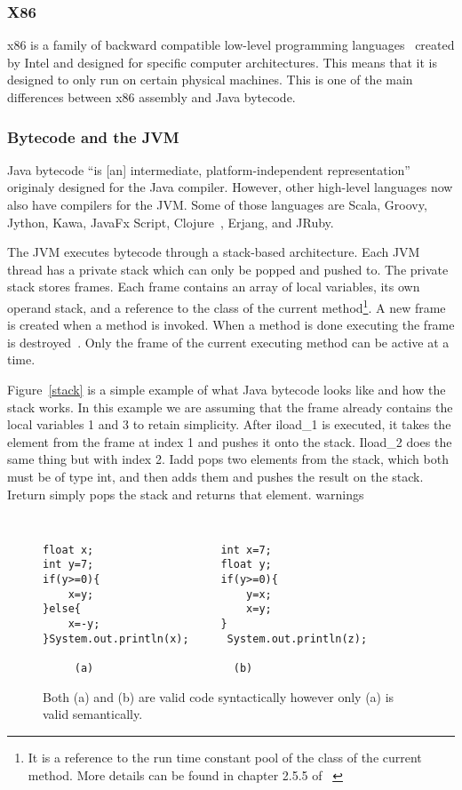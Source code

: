 \documentclass{sig-alternate}
\begin{document}
\subsubsection{X86}
x86 is a family of backward compatible low-level programming languages~\cite{x86assembly:2014} created by Intel and designed for specific computer architectures. This means that it is designed to only run on certain physical machines. This is one of the main differences between x86 assembly and Java bytecode. 

\subsubsection{ Bytecode and the JVM}
Java bytecode ``is [an] intermediate, platform-independent representation''~\cite{FINCH2:2009} originaly designed for the Java compiler. However, other high-level languages now also have compilers for the JVM. Some of those languages are Scala, Groovy, Jython, Kawa, JavaFx Script, Clojure~\cite{FINCH:2011}, Erjang, and JRuby.

The JVM executes bytecode through a stack-based architecture. Each JVM thread has a private stack which can only be popped and pushed to. The private stack stores frames. Each frame contains an array of local variables, its own operand stack, and a reference to the class of the current method\footnote{It is a reference to the run time constant pool of the class of the current method. More details can be found in chapter 2.5.5 of ~\cite{JVMspec:2013}}. A new frame is created when a method is invoked. When a method is done executing the frame is destroyed~\cite{Oracle:2013}. Only the frame of the current executing method can be active at a time.

Figure~\ref{stack} is a simple example of what Java bytecode looks like and how the stack works. In this example we are assuming that the frame already contains the local variables 1 and 3 to retain simplicity. After iload\_1 is executed, it takes the element from the frame at index 1 and pushes it onto the stack. Iload\_2 does the same thing but with index 2. Iadd pops two elements from the stack, which both must be of type int, and then adds them and pushes the result on the stack. Ireturn simply pops the stack and returns that element. warnings

\begin{figure}
\centering
{\tt
\begin{verbatim}
float x;                    int x=7;
int y=7;                    float y;
if(y>=0){                   if(y>=0){
    x=y;                        y=x;
}else{                          x=y;
    x=-y;                   }
}System.out.println(x);      System.out.println(z);	
     
     (a)                      (b)

\end{verbatim}
}
\caption{Both (a) and (b) are valid code syntactically however only (a) is valid semantically.}
\label{semantics}
\end{figure}
\end{document}
